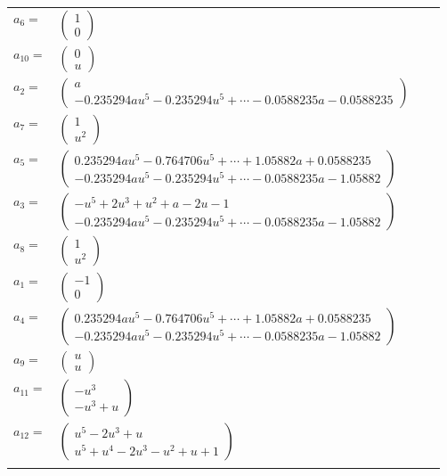 \documentclass[1p]{elsarticle_modified}
\theoremstyle{definition}
\begin{document}
\begin{tabular}{m{7pt} m{180pt} m{7pt} m{180pt} }
\flushright $a_{6}=$&$\begin{pmatrix}1\\0\end{pmatrix}$ \\
\flushright $a_{10}=$&$\begin{pmatrix}0\\u\end{pmatrix}$ \\
\flushright $a_{2}=$&$\begin{pmatrix}a\\-0.235294 a u^{5}-0.235294 u^{5}+\cdots-0.0588235 a-0.0588235\end{pmatrix}$ \\
\flushright $a_{7}=$&$\begin{pmatrix}1\\u^2\end{pmatrix}$ \\
\flushright $a_{5}=$&$\begin{pmatrix}0.235294 a u^{5}-0.764706 u^{5}+\cdots+1.05882 a+0.0588235\\-0.235294 a u^{5}-0.235294 u^{5}+\cdots-0.0588235 a-1.05882\end{pmatrix}$ \\
\flushright $a_{3}=$&$\begin{pmatrix}- u^5+2 u^3+u^2+a-2 u-1\\-0.235294 a u^{5}-0.235294 u^{5}+\cdots-0.0588235 a-1.05882\end{pmatrix}$ \\
\flushright $a_{8}=$&$\begin{pmatrix}1\\u^2\end{pmatrix}$ \\
\flushright $a_{1}=$&$\begin{pmatrix}-1\\0\end{pmatrix}$ \\
\flushright $a_{4}=$&$\begin{pmatrix}0.235294 a u^{5}-0.764706 u^{5}+\cdots+1.05882 a+0.0588235\\-0.235294 a u^{5}-0.235294 u^{5}+\cdots-0.0588235 a-1.05882\end{pmatrix}$ \\
\flushright $a_{9}=$&$\begin{pmatrix}u\\u\end{pmatrix}$ \\
\flushright $a_{11}=$&$\begin{pmatrix}- u^3\\- u^3+u\end{pmatrix}$ \\
\flushright $a_{12}=$&$\begin{pmatrix}u^5-2 u^3+u\\u^5+u^4-2 u^3- u^2+u+1\end{pmatrix}$\\&\end{tabular}
\end{document}
